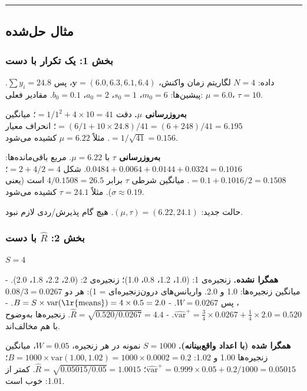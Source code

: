 \begin{center}\rule{0.5\linewidth}{0.5pt}\end{center}


\subsection{مثال حل‌شده}

\subsubsection{\texorpdfstring{بخش 1: یک تکرار  با
دست}{بخش 1: یک تکرار Gibbs با دست}}

داده: \(N = 4\) لگاریتم زمان واکنش،
\(\mathbf{y} = (6.0, 6.3, 6.1, 6.4)\)، پس \(\sum y_i = 24.8\). پیشین‌ها:
\(m_0 = 6\)، \(s_0 = 1\)، \(a_0 = 2\)، \(b_0 = 0.1\). مقادیر فعلی:
\(\mu = 6.0\)، \(\tau = 10\).

\textbf{به‌روزرسانی \(\mu\).} دقت \(= 1/1^2 + 4 \times 10 = 41\)؛ میانگین
\(= (6/1 + 10 \times 24.8)/41 = (6 + 248)/41 = 6.195\)؛ انحراف معیار
\(= 1/\sqrt{41} = 0.156\). مثلاً \(\mu = 6.22\) کشیده می‌شود.

\textbf{به‌روزرسانی \(\tau\)} با \(\mu = 6.22\). مربع باقی‌مانده‌ها:
\(0.0484 + 0.0064 + 0.0144 + 0.0324 = 0.1016\). شکل \(= 2 + 4/2 = 4\)؛
 \(= 0.1 + 0.1016/2 = 0.1508\). میانگین شرطی \(\tau\) برابر
\(4/0.1508 = 26.5\) است (یعنی \(\sigma \approx 0.19\)). مثلاً
\(\tau = 24.1\) کشیده می‌شود.

حالت جدید: \((\mu, \tau) = (6.22, 24.1)\). هیچ گام پذیرش/ردی لازم نبود.

\subsubsection{\texorpdfstring{بخش 2: \(\hat R\) با
دست}{بخش 2: \textbackslash hat R با دست}}

\(S = 4\)

\textbf{همگرا نشده.} زنجیره‌ی 1: (1.0، 1.2، 0.8، 1.0)؛ زنجیره‌ی 2: (2.0،
2.2، 1.8، 2.0). - میانگین زنجیره‌ها: 1.0 و 2.0. واریانس‌های درون‌زنجیره‌ای
 = 1): هر دو \(0.08/3 = 0.0267\)، پس \(W = 0.0267\). -
\(B = S \times \mathrm{var}(\text{\lr{means}}) = 4 \times 0.5 = 2.0\). -
\(\widehat{\mathrm{var}}^{+} = \tfrac34 \times 0.0267 + \tfrac14 \times 2.0 = 0.520\).
- \(\hat R = \sqrt{0.520/0.0267} = 4.4\). زنجیره‌ها به‌وضوح با هم
مخالف‌اند.

\textbf{همگرا شده (با اعداد واقع‌بینانه).} \(S = 1000\) نمونه در هر
زنجیره، \(W = 0.05\)، میانگین زنجیره‌ها 1.00 و 1.02:
\(B = 1000 \times \mathrm{var}(1.00,\allowbreak 1.02) = 1000 \times 0.0002 = 0.2\)؛
\(\widehat{\mathrm{var}}^{+} = 0.999 \times 0.05 + 0.2/1000 = 0.05015\)؛
\(\hat R = \sqrt{0.05015/0.05} = 1.0015\). کمتر از 1.01: خوب است.

